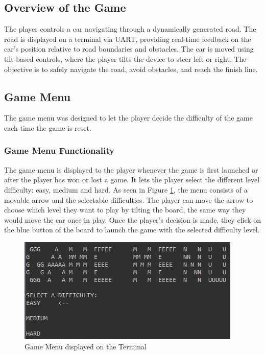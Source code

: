 \documentclass[conference]{IEEEtran}
\begin{document}
\subsection{Overview of the Game}
The player controls a car navigating through a dynamically generated road. The road is displayed on a terminal via UART, providing real-time feedback on the car's position relative to road boundaries and obstacles. The car is moved using tilt-based controls, where the player tilts the device to steer left or right. The objective is to safely navigate the road, avoid obstacles, and reach the finish line.
\subsection{Game Menu}
The game menu was designed to let the player decide the difficulty of the game each time the game is reset.

\subsubsection{Game Menu Functionality}
The game menu is displayed to the player whenever the game is first launched or after the player has won or lost a game. It lets the player select the different level difficulty: easy, medium and hard. As seen in Figure \ref{fig:game_menu}, the menu consists of a movable arrow and the selectable difficulties. The player can move the arrow to choose which level they want to play by tilting the board, the same way they would move the car once in play. Once the player's decision is made, they click on the blue button of the board to launch the game with the selected difficulty level. 
\begin{figure}
    \centering
    \includegraphics[width=1\linewidth]{game_menu.png}
    \caption{Game Menu displayed on the Terminal}
    \label{fig:game_menu}
\end{figure}
\end{document}
